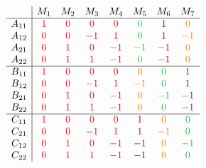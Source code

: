 \documentclass[MS]{wfuthesis}
\begin{document}
\begin{multicols}{2}
                        \columnbreak

                        \[\begin{array}{c|ccccccc}
                                & M_1 & M_2 & M_3 & M_4 & M_5 & M_6 & M_7 \\
                                \hline
                                A_{11} & \color{red} 1 & \color{red} 0 & \color{red} 0 & \color{red} 0  & \color{mycustomgreen} 0 &  \color{violet} 1 &  \color{orange} 0 \\
                                A_{12} & \color{red} 0 & \color{red} 0 & \color{red} -1 & \color{red} 1 & \color{mycustomgreen} 0 &  \color{violet} 1 &  \color{orange} -1 \\
                                A_{21} & \color{red} 0 & \color{red} 1 & \color{red} 0 & \color{red} -1 & \color{mycustomgreen} -1 & \color{violet} -1 & \color{orange} 0 \\
                                A_{22} & \color{red} 0 & \color{red} 1 & \color{red} 1 & \color{red} -1 & \color{mycustomgreen} 0 &  \color{violet} -1 & \color{orange} 0 \\
                                \hline
                                B_{11} & \color{red} 1 & \color{red} 0 & \color{red} 0 & \color{red} 0  & \color{orange} 0 &  \color{mycustomgreen} 0 &  \color{violet} 1 \\
                                B_{12} & \color{red} 0 & \color{red} 0 & \color{red} -1 & \color{red} 1 & \color{orange} -1 & \color{mycustomgreen} 0 &  \color{violet} 1 \\
                                B_{21} & \color{red} 0 & \color{red} 1 & \color{red} 0 & \color{red} -1 & \color{orange} 0 &  \color{mycustomgreen} -1 & \color{violet} -1 \\
                                B_{22} & \color{red} 0 & \color{red} 1 & \color{red} 1 & \color{red} -1 & \color{orange} 0 &  \color{mycustomgreen} 0 &  \color{violet} -1 \\
                                \hline
                                C_{11} & \color{red} 1 & \color{red} 0 & \color{red} 0 & \color{red} 0  & \color{violet} 1 &  \color{orange} 0 &  \color{mycustomgreen} 0 \\
                                C_{21} & \color{red} 0 & \color{red} 0 & \color{red} -1 & \color{red} 1 & \color{violet} 1 &  \color{orange} -1 & \color{mycustomgreen} 0 \\
                                C_{12} & \color{red} 0 & \color{red} 1 & \color{red} 0 & \color{red} -1 & \color{violet} -1 & \color{orange} 0 &  \color{mycustomgreen} -1 \\
                                C_{22} & \color{red} 0 & \color{red} 1 & \color{red} 1 & \color{red} -1 & \color{violet} -1 & \color{orange} 0 &  \color{mycustomgreen} 0 \\
                        \end{array}\]
                        
                    \end{multicols}
                    
\end{document}

